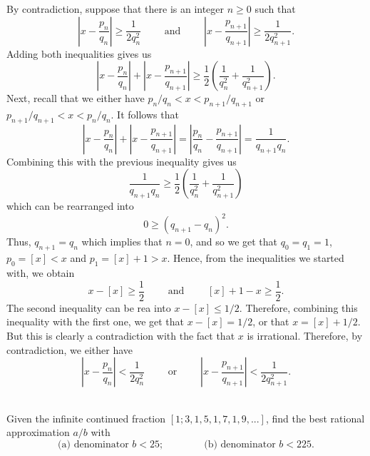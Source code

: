 \begin{solution}
    By contradiction, suppose that there is an integer $n \geq 0$ such that
    $$\left|x - \frac{p_n}{q_n}\right| \geq \frac{1}{2q_n^2} \qquad \text{ and } \qquad \left|x - \frac{p_{n+1}}{q_{n+1}}\right| \geq \frac{1}{2q_{n+1}^2}.$$
    Adding both inequalities gives us
    $$\left|x - \frac{p_n}{q_n}\right| + \left|x - \frac{p_{n+1}}{q_{n+1}}\right| \geq \frac{1}{2}\left(\frac{1}{q_n^2} + \frac{1}{q_{n+1}^2}\right).$$
    Next, recall that we either have $p_n/q_n < x < p_{n+1}/q_{n+1}$ or $p_{n+1}/q_{n+1} < x < p_n/q_n$. It follows that
    $$\left|x - \frac{p_n}{q_n}\right| + \left|x - \frac{p_{n+1}}{q_{n+1}}\right| = \left|\frac{p_n}{q_n} - \frac{p_{n+1}}{q_{n+1}}\right| = \frac{1}{q_{n+1}q_n}.$$
    Combining this with the previous inequality gives us 
    $$\frac{1}{q_{n+1}q_n} \geq \frac{1}{2}\left(\frac{1}{q_n^2} + \frac{1}{q_{n+1}^2}\right)$$
    which can be rearranged into
    $$0 \geq (q_{n+1} - q_n)^2.$$
    Thus, $q_{n+1} = q_n$ which implies that $n = 0$, and so we get that $q_0 = q_1 = 1$, $p_0 = [x] < x$ and $p_1 = [x] + 1 > x$. Hence, from the inequalities we started with, we obtain
    $$x - [x] \geq \frac{1}{2} \qquad \text{ and } \qquad [x] + 1 - x \geq \frac{1}{2}.$$
    The second inequality can be rea into $x - [x] \leq 1/2$. Therefore, combining this inequality with the first one, we get that $x - [x] = 1/2$, or that $x = [x] + 1/2$. But this is clearly a contradiction with the fact that $x$ is irrational. Therefore, by contradiction, we either have
    $$\left|x - \frac{p_n}{q_n}\right| < \frac{1}{2q_n^2} \qquad \text{ or } \qquad \left|x - \frac{p_{n+1}}{q_{n+1}}\right| < \frac{1}{2q_{n+1}^2}.$$ \\
\end{solution}

\begin{exercise}
    Given the infinite continued fraction $[1; 3, 1, 5, 1, 7, 1, 9, ...]$, find the best rational approximation $a/b$ with
    $$\text{(a)  denominator } b < 25; \qquad \qquad \text{(b)  denominator } b < 225.$$ \\
\end{exercise}

